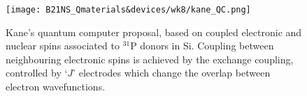 \documentclass[a4paper,11pt]{article}
\newcommand{\ket}[1]{| #1 \rangle}
\begin{document}
\begin{comment}
\subsubsection{Example: electron-nuclear quantum gates}
Consider a $S=1/2$ electronic spin coupled to a $I=1/2$ nuclear spin. We assume the hyperfine interaction has the form:
\begin{equation}
    \mathcal{H}_I \sim A S_z I_z
\end{equation}
We label the electron spin states by $\lbrace \ket{\uparrow} = \ket{m_s=+1/2}, \ket{\downarrow}= \ket{m_s=-1/2} \rbrace$ and the nuclear spin states by $\lbrace \ket{\Uparrow}= \ket{m_I=+1/2}, \ket{\Downarrow}= \ket{m_I=-1/2} \rbrace$.
\newline Suppose to prepare at $t=0$ both electron and nuclear spins in equal superpositions. The joint (product) state is:
\begin{equation}
    \ket{\psi} = \frac{1}{2} \left[ \ket{\uparrow, \Uparrow} + \ket{\uparrow, \Downarrow} + \ket{\downarrow, \Uparrow} + \ket{\downarrow, \Downarrow} \right]
\end{equation}
If we let this state freely evolve for a time $\tau$ under the Hamiltonian $\mathcal{H}_I$, we get:
\begin{equation}
    \ket{\psi} = \frac{1}{2} \left[ e^{iAt/4} \ket{\uparrow, \Uparrow} + e^{-iAt/4} \ket{\uparrow, \Downarrow} + e^{-iAt/4} \ket{\downarrow, \Uparrow} + e^{+iAt/4} \ket{\downarrow, \Downarrow} \right]
\end{equation}
Collecting $e^{+iAt/4}$ and neglecting global phases:
\begin{equation}
    \ket{\psi} = \frac{1}{2} \left[ \ket{\uparrow, \Uparrow} + e^{-iAt/2} \ket{\uparrow, \Downarrow} + e^{-iAt/2} \ket{\downarrow, \Uparrow} + \ket{\downarrow, \Downarrow} \right]
\end{equation}

\end{comment}



\begin{figure}[h]
\centering
\texttt{[image: B21NS\_Qmaterials\&devices/wk8/kane\_QC.png]}
\caption{Kane's quantum computer proposal, based on coupled electronic and nuclear spins associated to $^{31}$P donors in Si. Coupling between neighbouring electronic spins is achieved by the exchange coupling, controlled by `$J$' electrodes which change the overlap between electron wavefunctions.}
\label{fig:kane}
\end{figure}
\end{document}
